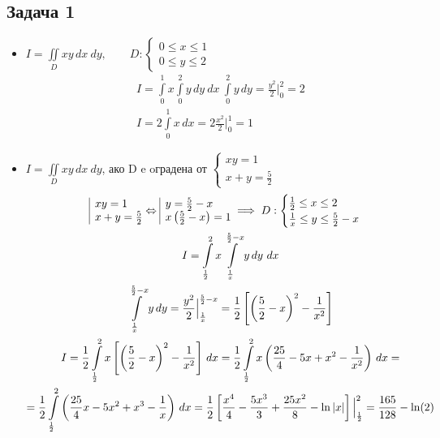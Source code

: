 \documentclass[a4paper,fleqn,12pt]{article}
\theoremstyle{definition}
\begin{document}
\subsection*{Задача 1}
\begin{itemize}
\item $I = \iint\limits_D xy \,dx \ dy, \qquad D: \begin{cases} 0 \leq x \leq 1 \\ 0 \leq y \leq 2 \end{cases}$
\begin{gather*}
I = \int\limits_0 ^1 x \int\limits_0 ^2 y \, dy \ dx   \
\int\limits_0 ^2 y \, dy = \frac{y^2}{2} \Big|_0 ^2 = 2 \\
I = 2 \int\limits_0 ^1 x \, dx = 2\frac{x^2}{2} \Big|_0 ^1 = 1
\end{gather*}

\item $I = \iint\limits _D xy \,dx \ dy$, ако D e oградена от $\begin{cases} xy = 1 \\ x+y = \frac{5}{2} \end{cases}$
\begin{gather*}
\begin{array}{|l@{}}
xy = 1 \\
x+y = \frac{5}{2}
\end{array} \Leftrightarrow
\begin{array}{|l@{}}
y = \frac{5}{2} - x \\
x \left( \frac{5}{2} - x \right) = 1 
\end{array}\implies 
D: \begin{cases} 
\frac{1}{2} \leq x \leq 2 \\
\frac{1}{x} \leq y \leq \frac{5}{2} - x
\end{cases}\\
I = \int\limits_{\frac{1}{2}} ^2 x \int\limits_{\frac{1}{x}} ^{\frac{5}{2} - x} y \, dy \ dx \\
\int\limits_{\frac{1}{x}} ^{\frac{5}{2} - x} y \, dy  = 
\frac{y^2}{2} \Big|_{\frac{1}{x}} ^{\frac{5}{2} - x} = 
\frac{1}{2}\left[ \left( \frac{5}{2} - x\right)^2 - \frac{1}{x^2} \right] \\
I = \frac{1}{2} \int\limits_{\frac{1}{2}} ^2 x \left[ \left( \frac{5}{2} - x\right)^2 - \frac{1}{x^2} \right] \, dx = \frac{1}{2} \int\limits_{\frac{1}{2}} ^2 x \left( \frac{25}{4} - 5x + x^2 - \frac{1}{x^2} \right) \, dx = \\
= \frac{1}{2} \int\limits_{\frac{1}{2}} ^2  \left( \frac{25}{4}x - 5x^2 + x^3 - \frac{1}{x} \right) \, dx = 
\frac{1}{2} \left[ \frac{x^4}{4} - \frac{5x^3}{3} + \frac{25x^2}{8} - \ln|x| \right] \Big|_{\frac{1}{2}} ^2 = \frac{165}{128} - \ln(2)
\end{gather*}


\end{itemize}
\end{document}
